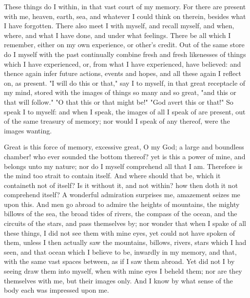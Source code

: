 \documentclass[b5paper,openright,12pt,twoside]{book}
\begin{document}
These things do I within, in that vast court of my memory. For there
are present with me, heaven, earth, sea, and whatever I could think on
therein, besides what I have forgotten. There also meet I with myself,
and recall myself, and when, where, and what I have done, and under what
feelings. There be all which I remember, either on my own experience,
or other's credit. Out of the same store do I myself with the past
continually combine fresh and fresh likenesses of things which I have
experienced, or, from what I have experienced, have believed: and thence
again infer future actions, events and hopes, and all these again I
reflect on, as present. "I will do this or that," say I to myself, in
that great receptacle of my mind, stored with the images of things so
many and so great, "and this or that will follow." "O that this or that
might be!" "God avert this or that!" So speak I to myself: and when
I speak, the images of all I speak of are present, out of the same
treasury of memory; nor would I speak of any thereof, were the images
wanting.

Great is this force of memory, excessive great, O my God; a large and
boundless chamber! who ever sounded the bottom thereof? yet is this a
power of mine, and belongs unto my nature; nor do I myself comprehend
all that I am. Therefore is the mind too strait to contain itself. And
where should that be, which it containeth not of itself? Is it without
it, and not within? how then doth it not comprehend itself? A wonderful
admiration surprises me, amazement seizes me upon this. And men go
abroad to admire the heights of mountains, the mighty billows of the
sea, the broad tides of rivers, the compass of the ocean, and the
circuits of the stars, and pass themselves by; nor wonder that when I
spake of all these things, I did not see them with mine eyes, yet could
not have spoken of them, unless I then actually saw the mountains,
billows, rivers, stars which I had seen, and that ocean which I believe
to be, inwardly in my memory, and that, with the same vast spaces
between, as if I saw them abroad. Yet did not I by seeing draw them into
myself, when with mine eyes I beheld them; nor are they themselves with
me, but their images only. And I know by what sense of the body each was
impressed upon me.
\end{document}

